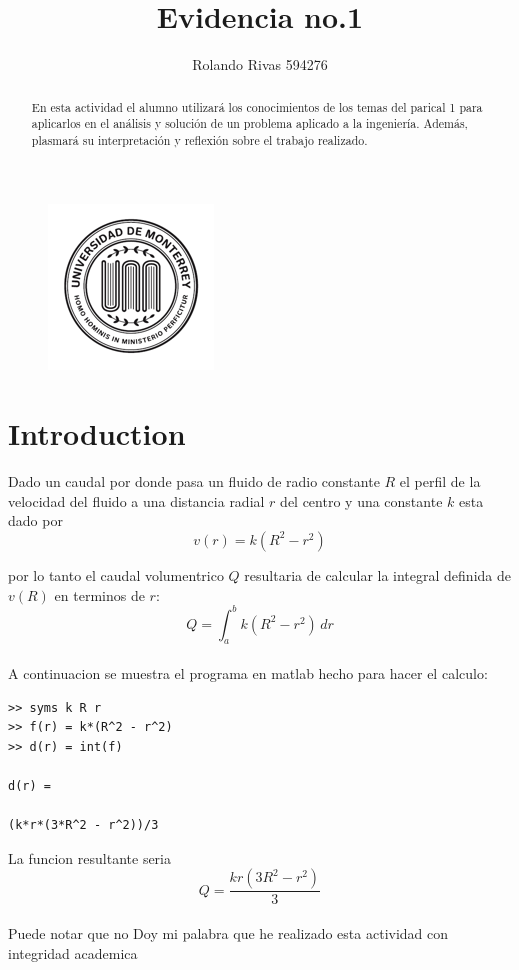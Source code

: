 \documentclass{article}
\title{Evidencia no.1}
\author{Rolando Rivas 594276}
\begin{document}
\begin{figure}
\centering
\includegraphics[width=0.5\linewidth]{UdemLogo.png}
\end{figure}

\maketitle

\begin{abstract}
En esta actividad el alumno utilizará los conocimientos de los temas del parical 1 para aplicarlos en el análisis y solución de un problema aplicado a la ingeniería. Además, plasmará su interpretación y reflexión sobre el trabajo realizado.
\end{abstract}

\section{Introduction}

Dado un caudal por donde pasa un fluido de radio constante $R$ el perfil de la velocidad del fluido a una distancia radial $r$ del centro y una constante $k$ esta dado por \[v(r) = k(R^2-r^2)\] 

por lo tanto el caudal volumentrico $Q$ resultaria de calcular la integral definida de $v(R)$ en terminos de $r$: \\ \[ Q =\int_{a}^{b} k(R^2-r^2) \,dr \] \\

A continuacion se muestra el programa en matlab hecho para hacer el calculo:

\begin{verbatim}
>> syms k R r
>> f(r) = k*(R^2 - r^2)
>> d(r) = int(f)
 
d(r) =
 
(k*r*(3*R^2 - r^2))/3
\end{verbatim}

La funcion resultante seria
\\
\[Q =\frac{kr(3R^2 - r^2)}{3}\]
\\
Puede notar que no 
Doy mi palabra que he realizado esta actividad con integridad academica
\end{document}
